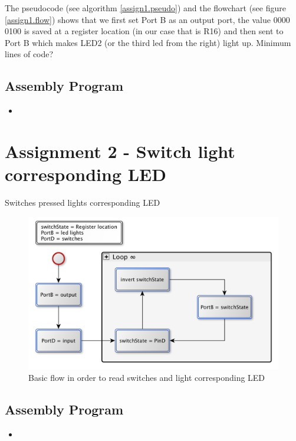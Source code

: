 \documentclass[a4paper, 12pt]{article}
\newcommand{\avrasm}[2]{
\begin{itemize}
\item[]
\end{itemize}
}
\begin{document}
The pseudocode (see algorithm \ref{assign1.pseudo}) and the flowchart (see figure \ref{assign1.flow}) shows that we first set Port B as an output port, the value 0000 0100 is saved at a register location (in our case that is R16) and then sent to Port B which makes LED2 (or the third led from the right) light up. 
Minimum lines of code?
\newpage
\subsection{Assembly Program}
\avrasm{../src/a1.asm}{}
\newpage

\section{Assignment 2 - Switch light corresponding LED}
\begin{algorithm}
\begin{algorithmic}
\Repeat
{} 
\Until{$\infty$}
\EndProcedure
\caption{Switches pressed lights corresponding LED}
\label{assign2.pseudo}
\end{algorithmic}
\end{algorithm}

\begin{figure}[h]
\includegraphics[scale=0.5]{Flowchart_pics/assignment2_pic.png} 
\caption{Basic flow in order to read switches and light corresponding LED}
\label{assign2.flow}
\end{figure}
\newpage
\subsection{Assembly Program}
\avrasm{../src/a2.asm}{}
\newpage
\end{document}

